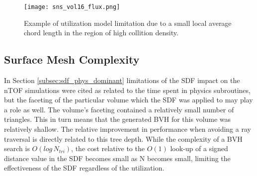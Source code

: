 \begin{figure}
  \centering
  \texttt{[image: sns\_vol16\_flux.png]}
  \caption{Example of utilization model limitation due to a small local average chord length
    in the region of high collition density.}
  \label{fig:sns_low_util}
\end{figure}

\subsection{Surface Mesh Complexity}\label{subsec:sdf_tree_depth}

In Section \ref{subsec:sdf_phys_dominant} limitations of the SDF impact on the
nTOF simulations were cited as related to the time spent in physics subroutines,
but the faceting of the particular volume which the SDF was applied to may play
a role as well. The volume's faceting contained a relatively small number of
triangles. This in turn means that the generated BVH for this volume was
relatively shallow. The relative improvement in performance when avoiding a ray
traversal is directly related to this tree depth. While the complexity of a BVH
search is $O(log\, N_{tri})$, the cost relative to the $O(1)$ look-up of a signed
distance value in the SDF becomes small as N becomes small, limiting the
effectiveness of the SDF regardless of the utilization.
